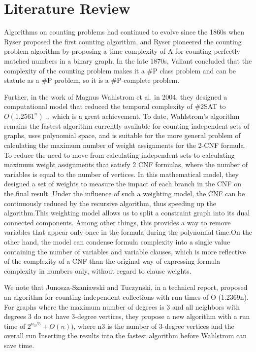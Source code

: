 \documentclass{sigchi}
\begin{document}
\section{Literature Review}
Algorithms on counting problems had continued to evolve since the 1860s when Ryser proposed the first counting algorithm\cite{10.1017/s0013091500011299}, and Ryser pioneered the counting problem algorithm by proposing a time complexity of A for counting perfectly matched numbers in a binary graph. In the late 1870s, Valiant concluded that the complexity of the counting problem makes it a \#P class problem and can be statute as a \#P problem, so it is a \#P-complete problem\cite{10.1016/0304-3975(79)90044-6}.

Further, in the work of Magnus Wahlstrom et al. in 2004, they designed a computational model that reduced the temporal complexity of \#2SAT to  $ O\left ( 1.2561^{n} \right )$ \cite{10.1016/j.tcs.2004.10.037}., which is a great achievement. To date, Wahlstrom's algorithm remains the fastest algorithm currently available for counting independent sets of graphs, uses polynomial space, and is suitable for the more general problem of calculating the maximum number of weight assignments for the 2-CNF formula. To reduce the need to move from calculating independent sets to calculating maximum weight assignments that satisfy 2 CNF formulas, where the number of variables is equal to the number of vertices. In this mathematical model, they designed a set of weights to measure the impact of each branch in the CNF on the final result. Under the influence of such a weighting model, the CNF can be continuously reduced by the recursive algorithm, thus speeding up the algorithm.This weighting model allows us to split a constraint graph into its dual connected components. Among other things, this provides a way to remove variables that appear only once in the formula during the polynomial time.On the other hand, the model can condense formula complexity into a single value containing the number of variables and variable clauses, which is more reflective of the complexity of a CNF than the original way of expressing formula complexity in numbers only, without regard to clause weights.

We note that Junosza-Szaniawski and Tuczynski, in a technical report, proposed an algorithm for counting independent collections with run times of O (1.2369n).\cite{undefined} For graphs where the maximum number of degrees is 3 and all neighbors with degrees 3 do not have 3-degree vertices, they propose a new algorithm with a run time of $2^{n_{3}/5} +O\left( n \right))$, where n3 is the number of 3-degree vertices and the overall run Inserting the results into the fastest algorithm before Wahlstrom \cite{10.1016/j.tcs.2004.10.037} can save time.
\end{document}
